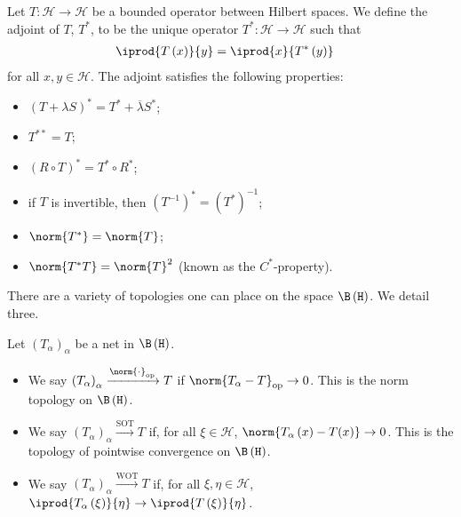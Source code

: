 \begin{definition}
  Let $T\colon \mathcal{H}\rightarrow \mathcal{H}$ be a bounded operator between Hilbert spaces. We define the adjoint of $T$, $T^{\ast}$, to be the unique operator $T^{\ast}\colon \mathcal{H}\rightarrow \mathcal{H}$ such that
  \begin{align*}
    \iprod{T\left(x\right)}{y} &= \iprod{x}{T^{\ast}\left(y\right)}
  \end{align*}
  for all $x,y\in \mathcal{H}$. The adjoint satisfies the following properties:
  \begin{itemize}
    \item $\left(T + \lambda S\right)^{\ast} = T^{\ast} + \overline{\lambda}S^{\ast}$;
    \item $T^{\ast\ast} = T$;
    \item $\left(R\circ T\right)^{\ast} = T^{\ast}\circ R^{\ast}$;
    \item if $T$ is invertible, then $\left(T^{-1}\right)^{\ast} = \left(T^{\ast}\right)^{-1}$;
    \item $\norm{T^{\ast}} = \norm{T}$;
    \item $\norm{T^{\ast}T} = \norm{T}^2$ (known as the $C^{\ast}$-property).
  \end{itemize}
\end{definition}
There are a variety of topologies one can place on the space $\B\left(\mathcal{H}\right)$. We detail three.
\begin{definition}
  Let $\left(T_{\alpha}\right)_{\alpha}$ be a net in $\B\left(\mathcal{H}\right)$.
  \begin{itemize}
    \item We say $\left(T_{\alpha}\right)_{\alpha}\xrightarrow{\norm{\cdot}_{\op}} T$ if $\norm{T_{\alpha} - T}_{\op}\rightarrow 0$. This is the norm topology on $\B\left(\mathcal{H}\right)$.
    \item We say $\left(T_{\alpha}\right)_{\alpha}\xrightarrow{ \text{SOT} } T$ if, for all $\xi\in \mathcal{H}$, $\norm{T_{\alpha}\left(x\right) - T(x)}\rightarrow 0$. This is the topology of pointwise convergence on $\B\left(\mathcal{H}\right)$.
    \item We say $\left(T_{\alpha}\right)_{\alpha}\xrightarrow{\text{WOT}}T$ if, for all $\xi,\eta\in \mathcal{H}$, $ \iprod{T_{\alpha}\left(\xi\right)}{\eta}\rightarrow \iprod{T\left(\xi\right)}{\eta} $.
  \end{itemize}
\end{definition}

